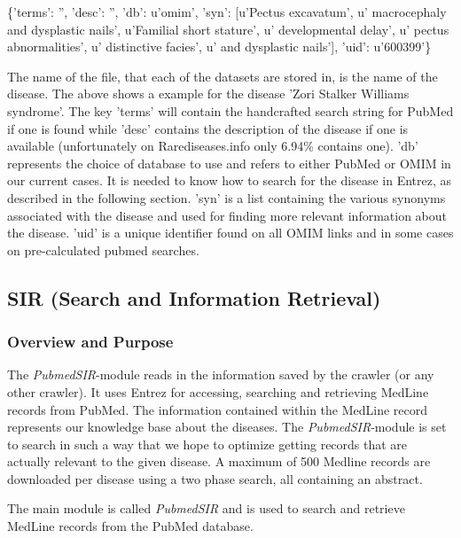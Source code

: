 \begin{center}
{\small
\{'terms': '', 'desc': '', 'db': u'omim', 'syn': [u'Pectus excavatum', u' macrocephaly and dysplastic nails', u'Familial short stature', u' developmental delay', u' pectus abnormalities', u' distinctive facies', u' and dysplastic nails'], 'uid': u'600399'\} 
}
\end{center}

The name of the file, that each of the datasets are stored in, is the
name of the disease. The above shows a example for the disease 'Zori
Stalker Williams syndrome'. The key 'terms' will contain the
handcrafted search string for PubMed if one is found while 'desc'
contains the description of the disease if one is available
(unfortunately on Rarediseases.info only 6.94\% contains one). 'db'
represents the choice of database to use and refers to either PubMed
or OMIM in our current cases. It is needed to know how to search for
the disease in Entrez, as described in the following section. 'syn' is
a list containing the various synonyms associated with the disease and
used for finding more relevant information about the disease. 'uid' is
a unique identifier found on all OMIM links and in some cases on
pre-calculated pubmed searches.

\subsection{SIR (Search and Information Retrieval)\label{SIR}}

\subsubsection{Overview and Purpose}
The \textit{PubmedSIR}-module reads in the information saved by the crawler (or any
other crawler). It uses Entrez for accessing, searching and retrieving
MedLine records from PubMed. The information contained within the
MedLine record represents our knowledge base about the diseases. The
\textit{PubmedSIR}-module is set to search in such a way that we hope to optimize
getting records that are actually relevant to the given disease. A
maximum of 500 Medline records are downloaded per disease using a two
phase search, all containing an abstract.

The main module is called \textit{PubmedSIR} and is used to search and
retrieve MedLine records from the PubMed database.

